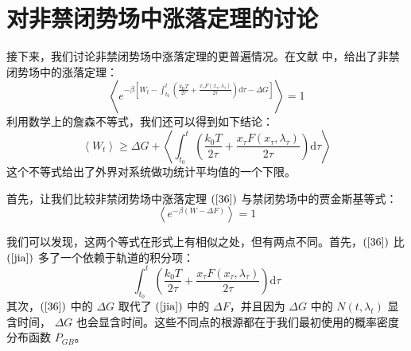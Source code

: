 \section{对非禁闭势场中涨落定理的讨论}
接下来，我们讨论非禁闭势场中涨落定理的更普遍情况。在文献\cite{streissnigWorkFluctuationTheorem2021}
中，给出了非禁闭势场中的涨落定理：
\begin{equation}\label{36}
\left\langle e^{-\beta\left[W_{t}-\int_{t_{0}}^{t}\left(\frac{k_{\mathrm{B}} T}{2 \tau}+\frac{x_{\tau} F\left(x_{\tau}, \lambda_{\tau}\right)}{2 \tau}\right) \mathrm{d} \tau-\Delta G\right]}\right\rangle=1
\end{equation}
利用数学上的詹森不等式，我们还可以得到如下结论：
\begin{equation}\label{37}
\left\langle W_{t}\right\rangle \geqslant \Delta G+\left\langle\int_{t_{0}}^{t}\left(\frac{k_{0} T}{2 \tau}+\frac{x_{\tau} F\left(x_{\tau}, \lambda_{\tau}\right)}{2 \tau}\right) \mathrm{d} \tau\right\rangle
\end{equation}
这个不等式给出了外界对系统做功统计平均值的一个下限。

首先，让我们比较非禁闭势场中涨落定理  $(\ref{36})$  与禁闭势场中的贾金斯基等式：
\begin{equation}\label{jia}
\left\langle e^{-\beta(W-\Delta F)}\right\rangle=1
\end{equation}

我们可以发现，这两个等式在形式上有相似之处，但有两点不同。首先，$(\ref{36})$  比  $(\ref{jia})$  多了一个依赖于轨道的积分项：
\begin{equation}
\int_{t_{0}}^{t}\left(\frac{k_{0} T}{2 \tau}+\frac{x_{\tau} F\left(x_{\tau}, \lambda_{\tau}\right)}{2 \tau}\right) \mathrm{d} \tau
\end{equation}
其次，$(\ref{36})$  中的  $\Delta G$  取代了  $(\ref{jia})$  中的  $\Delta F$，并且因为  $\Delta G$  中的  $N\left(t, \lambda_{t}\right)$  显含时间，  $\Delta G$  也会显含时间。这些不同点的根源都在于我们最初使用的概率密度分布函数  $P_{GB}$。

